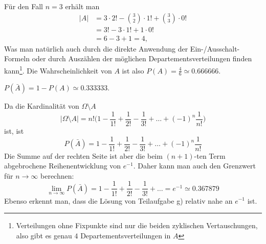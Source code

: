 \begin{loesung}
\begin{teilaufgaben}
Für den Fall $n=3$ erhält man
\begin{align*}
|A|
&=
3\cdot 2! - \binom{3}{2}\cdot 1! + \binom{3}{3}\cdot 0! 
\\
&=
3! - 3\cdot 1! + 1\cdot 0!
\\
&=
6-3+1=4,
\end{align*}
Was man natürlich auch durch die direkte Anwendung der Ein-/Ausschalt-Formeln
oder durch Auszählen der möglichen Departementsverteilungen finden kann\footnote{Verteilungen ohne Fixpunkte sind nur die beiden zyklischen Vertauschungen,
also gibt es genau $4$ Departementsverteilungen in $A$}.
Die Wahrscheinlichkeit von $A$ ist also $P(A)=\frac{4}{6}\simeq0.666666$.
\item
$P(\bar A)=1-P(A)\simeq 0.333333$.
\end{teilaufgaben}
Da die Kardinalität von $\Omega\setminus A$
\[
|\Omega\setminus A|
= n!\biggl(1-\frac1{1!}+\frac1{2!}-\frac1{3!}+\dots+(-1)^n\frac1{n!}\biggr)
\]
ist, ist
\[
P(\bar A)
= 1-\frac1{1!}+\frac1{2!}-\frac1{3!}+\dots+(-1)^n\frac1{n!}
\]
Die Summe auf der rechten Seite ist aber die beim $(n+1)$-ten Term
abgebrochene Reihenentwicklung von $e^{-1}$. Daher kann man auch
den Grenzwert für $n\to\infty$ berechnen:
\[
\lim_{n\to\infty}P(\bar A)
= 1-\frac1{1!}+\frac1{2!}-\frac1{3!}+\dots=e^{-1}
\simeq 0.367879
\]
Ebenso erkennt man, dass die Lösung von Teilaufgabe g) relativ
nahe an $e^{-1}$ ist.
\end{loesung}

